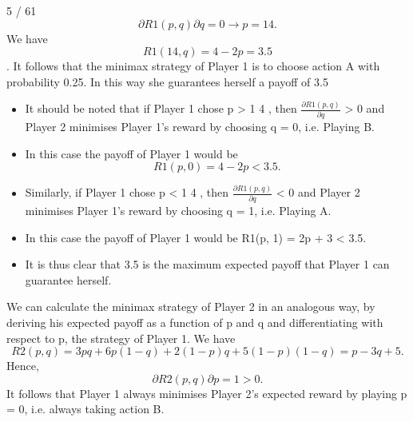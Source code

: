 \documentclass[]{report}
\begin{document}
	5 / 61
	\[ \partial R1(p, q)
	\partial q
	= 0 \rightarrow p =
	1
	4
	.\]
	We have
	\[R1(
	1
	4
	, q) = 4 − 2p = 3.5\].
	It follows that the minimax strategy of Player 1 is to choose action
	A with probability 0.25. In this way she guarantees herself a payoff
	of 3.5
	\begin{itemize}
		\item It should be noted that if Player 1 chose p >
		1
		4
		, then $\frac{\partial R1(p,q)}{\partial q}$ > 0
		and Player 2 minimises Player 1’s reward by choosing q = 0, i.e.
		Playing B.
		\item In this case the payoff of Player 1 would be
		\[R1(p, 0) = 4 − 2p < 3.5.\]
		\item 	Similarly, if Player 1 chose p <
		1
		4
		, then $\frac{\partial R1(p,q)}{\partial q}$ < 0 and Player 2
		minimises Player 1’s reward by choosing q = 1, i.e. Playing A.
		\item 	In this case the payoff of Player 1 would be
		R1(p, 1) = 2p + 3 < 3.5.
		\item  It is thus clear that 3.5 is the maximum
		expected payoff that Player 1 can guarantee herself.
	\end{itemize}
	
	We can calculate the minimax strategy of Player 2 in an analogous
	way, by deriving his expected payoff as a function of p and q and
	differentiating with respect to p, the strategy of Player 1. We have
	\[R2(p, q) = 3pq+6p(1−q)+2(1−p)q+5(1−p)(1−q) = p−3q+5.\]
	Hence,
	\[\partial R2(p, q)
	\partial p
	= 1 > 0.\]
	It follows that Player 1 always minimises Player 2’s expected
	reward by playing p = 0, i.e. always taking action B.
\end{document}
